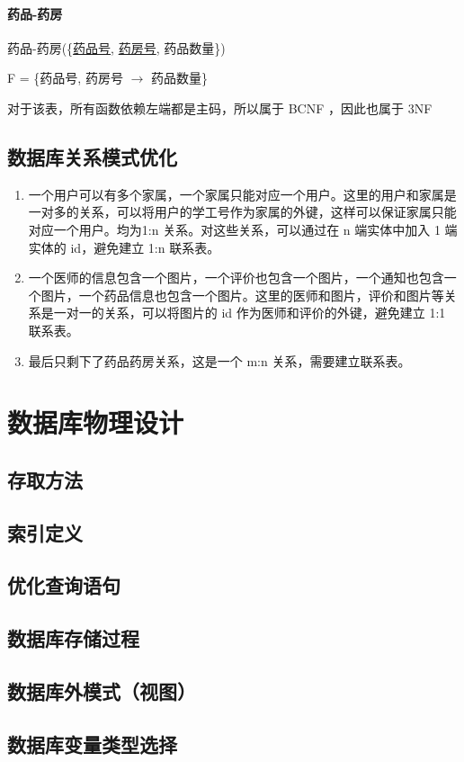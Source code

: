 \documentclass{article}
\begin{document}
\paragraph{药品-药房}

药品-药房(\{\underline{药品号}, \underline{药房号}, 药品数量\})

F = \{药品号, 药房号 $\rightarrow$ 药品数量\}

对于该表，所有函数依赖左端都是主码，所以属于 BCNF ，因此也属于 3NF

\subsection{数据库关系模式优化}

\begin{enumerate}
    \item 一个用户可以有多个家属，一个家属只能对应一个用户。这里的用户和家属是一对多的关系，可以将用户的学工号作为家属的外键，这样可以保证家属只能对应一个用户。均为1:n 关系。对这些关系，可以通过在 n 端实体中加入 1 端实体的 id，避免建立 1:n 联系表。
    \item 一个医师的信息包含一个图片，一个评价也包含一个图片，一个通知也包含一个图片，一个药品信息也包含一个图片。这里的医师和图片，评价和图片等关系是一对一的关系，可以将图片的 id 作为医师和评价的外键，避免建立 1:1 联系表。
    \item 最后只剩下了药品药房关系，这是一个 m:n 关系，需要建立联系表。
\end{enumerate}

\section{数据库物理设计}

\subsection{存取方法}

\subsection{索引定义}

\subsection{优化查询语句}

\subsection{数据库存储过程}

\subsection{数据库外模式（视图）}

\subsection{数据库变量类型选择}
\end{document}
